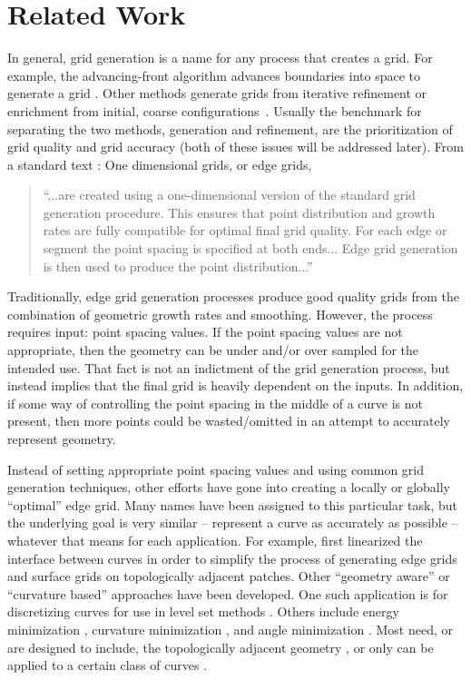 \section{Related Work}
In general, grid generation is a name for any process that creates a grid.  
For example, the advancing-front algorithm advances boundaries into space 
to generate a grid \cite{lohner88}.  Other methods generate grids from 
iterative refinement or enrichment from initial, coarse 
configurations~\cite{shewchuk98,shewchuk02}.
Usually the benchmark for separating the two 
methods, generation and refinement, are the prioritization of grid quality and grid accuracy (both of these issues will be addressed later).  From a standard text \cite{thompson98}: One dimensional grids, or edge grids, 

\begin{quotation}
\noindent ``...are created using a one-dimensional version of the standard grid generation procedure.  This ensures that point distribution and growth rates are fully compatible for optimal final grid quality.  For each edge or segment the point spacing is specified at both ends... Edge grid generation is then used to produce the point distribution...''
\end{quotation} 

\noindent Traditionally, edge grid generation processes produce good 
quality grids from the combination of geometric growth rates and 
smoothing.  However, the process requires input: point spacing values.  If the point spacing values are not appropriate, then the geometry can be under and/or over sampled for the intended use.  That fact is not an indictment of the grid generation process, but instead implies that the final grid is heavily dependent on the inputs.  In addition, if some way of controlling the point spacing in the middle of a curve is not present, then more points could be wasted/omitted in an attempt to accurately represent geometry.

Instead of setting appropriate point spacing values and using common grid generation techniques, other efforts have gone into creating a locally or globally ``optimal'' edge grid.  Many names have been assigned to this particular task, but the underlying goal is very similar -- represent a curve as accurately as possible -- whatever that means for each application.  For example, \cite{laug04} first linearized the interface between curves in order to simplify the process of generating edge grids and surface grids on topologically adjacent patches.  Other ``geometry aware'' or ``curvature based'' approaches have been developed.  One such application is for discretizing curves for use in level set methods \cite{macklin06}.  Others include energy minimization \cite{hofer04}, curvature minimization \cite{zehiry10}, and angle minimization \cite{ebeida10}. Most need, or are designed to include, the topologically adjacent geometry \cite{quadros04,cabello03,cunha97}, or only can be applied to a certain class of curves \cite{cuilliere97}.
